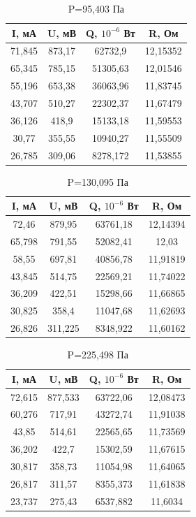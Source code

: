 \documentclass[a4paper]{article}
\begin{document}
	\begin{table}[h!]
 		\centering
    	\begin{tabular}{| c | c | c | c |}
    		\hline
    		I, мА & U, мВ & Q, $10^{-6}$ Вт & R, Ом \\
    		\hline
    		71,845 & 873,17	 & 62732,9 & 	12,15352 \\
    		\hline
65,345	 & 785,15	 & 51305,63 & 	12,01546\\
    		\hline
55,196	 & 653,38	 & 36063,96 & 	11,83745\\
    		\hline
43,707	 & 510,27	 & 22302,37	 & 11,67479\\
    		\hline
36,126	 & 418,9	 & 15133,18 & 	11,59553\\
    		\hline
30,77	 & 355,55	 & 10940,27 & 	11,55509\\
    		\hline
26,785	 & 309,06	 & 8278,172 & 	11,53855\\
    		\hline
    	\end{tabular}
    	\caption{P=95,403 Па}
	\end{table}
	\begin{table}[h!]
 		\centering
    	\begin{tabular}{| c | c | c | c |}
    		\hline
    		I, мА & U, мВ & Q, $10^{-6}$ Вт & R, Ом \\
    		\hline
    		72,46 & 879,95	 & 63761,18	 & 12,14394 \\
    		\hline
65,798	 & 791,55	 & 52082,41	 & 12,03\\
    		\hline
58,55	 & 697,81	 & 40856,78	 & 11,91819\\
    		\hline
43,845	 & 514,75 & 	22569,21 & 	11,74022\\
    		\hline
36,209	 & 422,51	 & 15298,66	 & 11,66865\\
    		\hline
30,825 & 	358,4 & 	11047,68 & 	11,62693\\
    		\hline
26,826 &	311,225	 & 8348,922	& 11,60162 \\ 
    		\hline
    	\end{tabular}
    	\caption{P=130,095 Па}
	\end{table}
	\begin{table}[h!]
 		\centering
    	\begin{tabular}{| c | c | c | c |}
    		\hline
    		I, мА & U, мВ & Q, $10^{-6}$ Вт & R, Ом \\
    		\hline
    		72,615 &	877,533 &	63722,06 &	12,08473\\
			\hline
60,276&	717,91	&43272,74&	11,91038 \\
			\hline
43,85	&514,61	&22565,65	&11,73569\\
			\hline
36,202&	422,7	&15302,59	&11,67615\\
			\hline
30,817	&358,73	&11054,98&	11,64065\\
			\hline
26,817&	311,57&	8355,373&	11,61838\\
			\hline
23,737	&275,43	&6537,882&	11,6034\\
			\hline
    	\end{tabular}
    	\caption{P=225,498 Па}
	\end{table}
\end{document}
